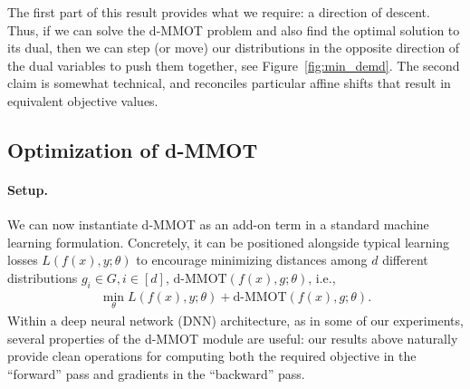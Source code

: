 \begin{remark} The first part of this result provides what we require: a direction of descent. 
Thus, if we can solve the d-MMOT problem and also find the optimal solution to its dual, 
then we can step (or move) our distributions in the opposite direction of the dual variables
to push them together, see Figure~\ref{fig:min_demd}.
The second claim is somewhat technical, and reconciles particular affine shifts that result in equivalent objective values.
\end{remark}

\subsection{Optimization of d-MMOT}\label{sec:dual}

\paragraph{Setup.} 
We can now instantiate d-MMOT as an add-on term in a standard machine learning formulation. Concretely, it can be positioned alongside typical learning losses $L(f(x),y;\theta)$ to encourage minimizing distances among $d$ different distributions $g_i\in G, i \in [d]$, $\text{d-MMOT}(f(x),g;\theta)$, i.e., 
\begin{align}
\min_{\theta} L(f(x),y;\theta) + \text{d-MMOT}(f(x),g;\theta).
\end{align}
Within a deep neural network (DNN) architecture, as in some of our experiments,  
several properties of the d-MMOT module are useful:
our results above naturally provide clean operations for computing both the required objective in the ``forward'' pass and gradients in the ``backward'' pass.


